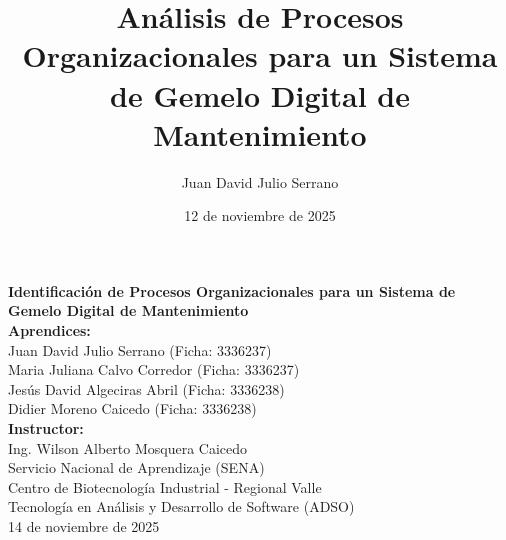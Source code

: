 \documentclass[12pt, a4paper]{article}
\title{Análisis de Procesos Organizacionales para un Sistema de Gemelo Digital de Mantenimiento}
\author{Juan David Julio Serrano}
\date{12 de noviembre de 2025}
\begin{document}
\begin{titlepage}
    \begin{center}
        \vspace*{2.5cm}
        {\Huge \bfseries Identificación de Procesos Organizacionales para un Sistema de Gemelo Digital de Mantenimiento}\\[2cm]
        
        {\large \bfseries Aprendices:}\\[0.5cm]
        \large{Juan David Julio Serrano (Ficha: 3336237)}\\[0.3cm]
        \large{Maria Juliana Calvo Corredor (Ficha: 3336237)}\\[0.3cm]
        \large{Jesús David Algeciras Abril (Ficha: 3336238)}\\[0.3cm]
        \large{Didier Moreno Caicedo (Ficha: 3336238)}\\[1.2cm]
        
        {\large \bfseries Instructor:}\\[0.5cm]
        \large{Ing. Wilson Alberto Mosquera Caicedo}\\[1.5cm]
        
        \vspace{1cm}
        \large{Servicio Nacional de Aprendizaje (SENA)}\\[0.4cm]
        \large{Centro de Biotecnología Industrial - Regional Valle}\\[0.4cm]
        \large{Tecnología en Análisis y Desarrollo de Software (ADSO)}\\[1.2cm]
        \large{14 de noviembre de 2025}
    \end{center}
\end{titlepage}

\clearpage
\tableofcontents
\clearpage
\doublespacing








\clearpage
\printbibliography[heading=bibintoc,title=Referencias]
\end{document}
